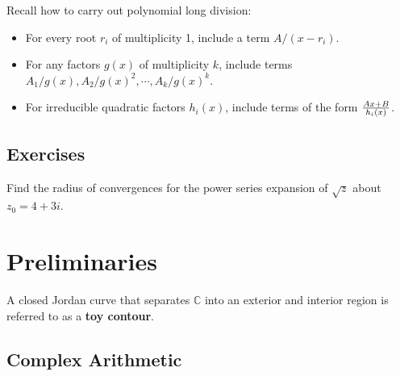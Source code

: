 \begin{fact}

Recall how to carry out polynomial long division:


\end{fact}

\begin{fact}

\envlist

\begin{itemize}
\tightlist
\item
  For every root \(r_i\) of multiplicity 1, include a term
  \(A/(x-r_i)\).
\item
  For any factors \(g(x)\) of multiplicity \(k\), include terms
  \(A_1/g(x), A_2/g(x)^2, \cdots, A_k / g(x)^k\).
\item
  For irreducible quadratic factors \(h_i(x)\), include terms of the
  form \({Ax+B \over h_i(x)}\).
\end{itemize}

\end{fact}

\hypertarget{exercises}{%
\subsection{Exercises}\label{exercises}}

\begin{exercise}[?]

Find the radius of convergences for the power series expansion of
\(\sqrt{z}\) about \(z_0 = 4 +3i\).

\end{exercise}

\hypertarget{preliminaries}{%
\section{Preliminaries}\label{preliminaries}}

\begin{definition}

A closed Jordan curve that separates \({\mathbb{C}}\) into an exterior
and interior region is referred to as a \textbf{toy contour}.

\end{definition}

\hypertarget{complex-arithmetic}{%
\subsection{Complex Arithmetic}\label{complex-arithmetic}}

